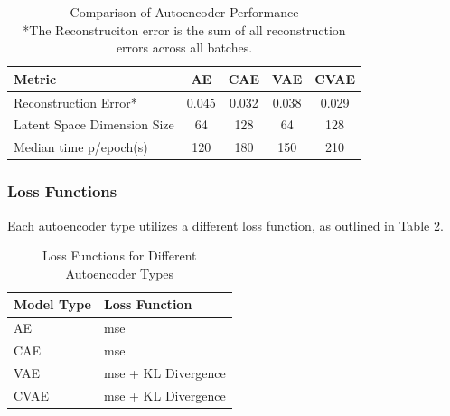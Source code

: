 \begin{table}[!htbp]
    \centering
    \begin{tabular}{lcccc}
        \hline
        \textbf{Metric} & \textbf{AE} & \textbf{CAE} & \textbf{VAE} & \textbf{CVAE} \\
        \hline
        Reconstruction Error* & 0.045 & 0.032 & 0.038 & 0.029 \\
        Latent Space Dimension Size & 64 & 128 & 64 & 128 \\
        Median time p/epoch(s) & 120 & 180 & 150 & 210 \\
        \hline
    \end{tabular}
    \caption{Comparison of Autoencoder Performance\\ *The Reconstruciton error is the sum of all reconstruction errors across all batches.}
    \label{tab:autoencoder_comparison}
\end{table}

\subsubsection{Loss Functions}

Each autoencoder type utilizes a different loss function, as outlined in Table \ref{tab:loss_functions}.

\begin{table}[!htbp]
    \centering
    \begin{tabular}{ll}
        \hline
        \textbf{Model Type} & \textbf{Loss Function} \\
        \hline
        AE & \acrshort{mse} \\
        CAE & \acrshort{mse} \\
        VAE & \acrshort{mse} + KL Divergence \\
        CVAE & \acrshort{mse} + KL Divergence \\
        \hline
    \end{tabular}
    \caption{Loss Functions for Different Autoencoder Types}
    \label{tab:loss_functions}
\end{table}


